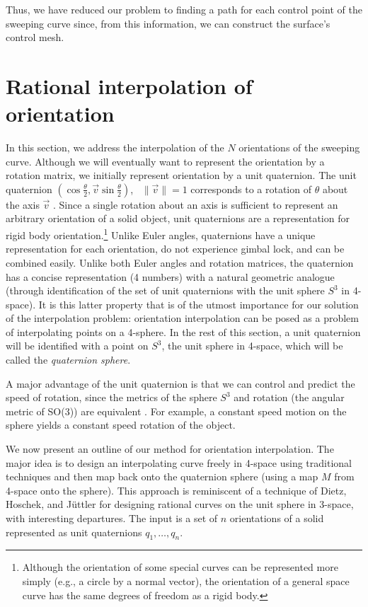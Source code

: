 Thus, we have reduced our problem to finding a path for each control point of
the sweeping curve since, from this information, 
we can construct the surface's control mesh.

\section{Rational interpolation of orientation}
\label{sec:orient-express}

In this section, we address the interpolation of the $N$ orientations
of the sweeping curve.
Although we will eventually want to represent the orientation 
by a rotation matrix, we initially 
represent orientation by a unit quaternion.
The unit quaternion
$(\cos \frac{\theta}{2}, \vec{v} \sin \frac{\theta}{2})$, \ $\|\vec{v}\| = 1$
corresponds to a rotation of $\theta$ about the axis $\vec{v}$ 
\cite{hoschek+lasser93}.
Since a single rotation about an axis is sufficient
to represent an arbitrary orientation of a solid object,
unit quaternions are a representation for rigid body 
orientation.\footnote{Although the orientation of some special curves
     can be represented more simply (e.g., a circle by a normal 
     vector), the orientation of a general space curve has the same degrees
     of freedom as a rigid body.}
Unlike Euler angles, quaternions have a unique representation 
for each orientation, do not experience gimbal lock, and can be
combined easily.
Unlike both Euler angles and rotation matrices,
the quaternion has a concise representation (4 numbers) with a natural
geometric analogue (through identification of the set of unit quaternions 
with the unit sphere $S^3$ in 4-space).
It is this latter property that is of the utmost importance for 
our solution of the
interpolation problem: orientation interpolation can be posed as
a problem of interpolating points on a 4-sphere.
In the rest of this section, a unit quaternion will be identified
with a point on $S^3$, the unit sphere in 4-space, which will be
called the {\em quaternion sphere}.

A major advantage of the unit quaternion is that we can 
control and predict the speed of rotation,
since the metrics of the sphere $S^3$ and rotation (the angular metric of
SO(3)) are equivalent \cite{misner73}.
For example, a constant speed motion on the sphere yields a constant
speed rotation of the object.

We now present an outline of our method for orientation interpolation.
The major idea is to design an interpolating curve freely in 4-space
using traditional techniques and then map back onto the quaternion sphere
(using a map $M$ from 4-space onto the sphere).
This approach is reminiscent of a technique of Dietz, Hoschek, and J\"{u}ttler 
\cite{dietz93} for designing rational curves on the unit sphere in 3-space,
with interesting departures.
The input is a set of $n$ orientations of a solid
represented as unit quaternions $q_1,\ldots,q_n$.

